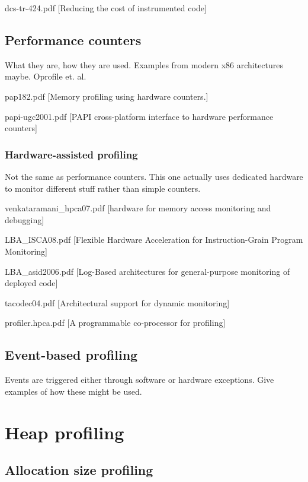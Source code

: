 dcs-tr-424.pdf [Reducing the cost of instrumented code]

\subsection{Performance counters}
\label{subsection:performancecounters}

What they are, how they are used. Examples from modern x86 architectures maybe. Oprofile et. al.

pap182.pdf [Memory profiling using hardware counters.]

papi-ugc2001.pdf [PAPI cross-platform interface to hardware performance counters]

\subsubsection{Hardware-assisted profiling}
\label{subsubsection:hardwareassistedprofiling}

Not the same as performance counters. This one actually uses dedicated hardware to monitor different stuff rather than simple counters.

venkataramani\_hpca07.pdf [hardware for memory access monitoring and debugging]

LBA\_ISCA08.pdf [Flexible Hardware Acceleration for Instruction-Grain Program Monitoring]

LBA\_asid2006.pdf [Log-Based architectures for general-purpose monitoring of deployed code]

tacodec04.pdf [Architectural support for dynamic monitoring]

profiler.hpca.pdf [A programmable co-processor for profiling]

\subsection{Event-based profiling}
\label{subsection:eventbasedprofiling}

Events are triggered either through software or hardware exceptions. Give examples of how these might be used.

\section{Heap profiling}
\label{section:heapprofiling}

\subsection{Allocation size profiling}
\label{subsubsection:allocationsizeprofiling}

